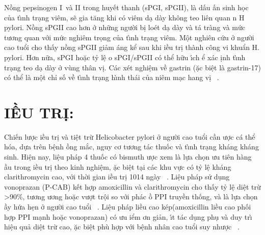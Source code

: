 \documentclass[9pt,twocolumn]{article}
\begin{document}
Nồng  pepsinogen I~v\`{a} II trong huy{{\'{\^{e}}}}t thanh (sPGI, sPGII), l\`{a} dấu ấn sinh h\d{o}c của t\`{\i}nh tr{\d{a}}ng vi{\^{e}}m, sẽ gia t{\u{a}}ng khi c{\'{o}} vi{\^{e}}m d{\d{a}} d\`{a}y kh{\^o}ng teo li{\^{e}}n quan n H pylori. Nồng  sPGII cao hơn ở những người b\d{i} lo{\'e}t d{\d{a}} d\`{a}y v\`{a} t\'{a} tr\`{a}ng v\`{a} mức  tương quan với mức  nghi{\^{e}}m tr\d{o}ng của t\`{\i}nh tr{\d{a}}ng vi{\^{e}}m. M{\^{\d{o}}}t nghi{\^{e}}n cứu ở người cao tuổi cho thấy nồng  sPGII giảm \text{\dj}\'{a}ng kể sau khi \text{\dj}iều tr\d{i} th\`{a}nh c{\^o}ng vi khuẩn H. pylori. Hơn nữa, sPGI hoặc tỷ l{\^{\d{e}}} \text{\dj}o sPGI/sPGII c{\'{o}} thể hữu \'{\i}ch \text{\dj}ể x\'{a}c \text{\dj}\d{i}nh t\`{\i}nh tr{\d{a}}ng teo d{\d{a}} d\`{a}y ở v\`{u}ng th\^{a}n v\d{i}. C\'{a}c x{\'e}t nghi{\^{\d{e}}}m về gastrin (\text{\dj}ặc bi{\^{\d{e}}}t l\`{a} gastrin-17) c{\'{o}} thể l\`{a} m{\^{\d{o}}}t chỉ số về t\`{\i}nh tr{\d{a}}ng h\`{\i}nh th\'{a}i của ni{\^{e}}m m{\d{a}}c hang v\d{i}\unskip~\cite{2901310:34531816} .
    
\section*
  {\textbf{\text{\DJ}IỀU TR\d{I}:}}
Chi{{\'{\^{e}}}}n lược \text{\dj}iều tr\d{i} v\`{a} ti{\^{\d{e}}}t trừ Helicobacter pylori ở người cao tuổi cần \text{\dj}ược c\'{a} thể h{\'{o}}a, dựa tr{\^{e}}n b{\^{\d{e}}}nh \text{\dj}ồng mắc, nguy cơ tương t\'{a}c thuốc v\`{a} t\`{\i}nh tr{\d{a}}ng kh\'{a}ng kh\'{a}ng sinh. Hi{\^{\d{e}}}n nay, li{\^{\d{e}}}u ph\'{a}p 4 thuốc c{\'{o}} bismuth \text{\dj}ược xem l\`{a} lựa ch\d{o}n ưu ti{\^{e}}n h\`{a}ng \text{\dj}ầu trong \text{\dj}iều tr\d{i} theo kinh nghi{\^{\d{e}}}m, \text{\dj}ặc bi{\^{\d{e}}}t t{\d{a}}i c\'{a}c khu vực c{\'{o}} tỷ l{\^{\d{e}}} kh\'{a}ng clarithromycin cao, với thời gian \text{\dj}iều tr\d{i} 10{\textendash}14 ng\`{a}y\unskip~\cite{2901310:34531808,2901310:34531813,2901310:34531814} . Li{\^{\d{e}}}u ph\'{a}p sử d\d{u}ng vonoprazan (P-CAB) k{{\'{\^{e}}}}t hợp amoxicillin v\`{a} clarithromycin cho thấy tỷ l{\^{\d{e}}} di{\^{\d{e}}}t trừ {\textgreater}90\%, tương \text{\dj}ương hoặc vượt tr{\^{\d{o}}}i so với ph\'{a}c \text{\dj}ồ PPI truyền thống, v\`{a} l\`{a} lựa ch\d{o}n \text{\dj}ầy hứa h\d{e}n ở người cao tuổi\unskip~\cite{2901310:34531807,2901310:34531815} . Li{\^{\d{e}}}u ph\'{a}p liều cao k{\'e}p\textbf{\space }(amoxicillin liều cao phối hợp PPI m{\d{a}}nh hoặc vonoprazan) c{\'{o}} ưu \text{\dj}iểm \text{\dj}ơn giản, \'{\i}t t\'{a}c d\d{u}ng ph\d{u} v\`{a} duy tr\`{\i} hi{\^{\d{e}}}u quả di{\^{\d{e}}}t trừ cao, \text{\dj}ặc bi{\^{\d{e}}}t ph\`{u} hợp với b{\^{\d{e}}}nh nh\^{a}n cao tuổi suy nhược\unskip~\cite{2901310:34531807,2901310:34531815} .
\end{document}
